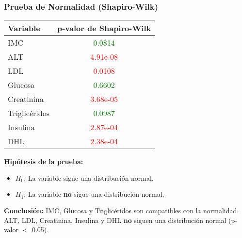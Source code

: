 \documentclass[
	11pt, %
]{beamer}
\begin{document}
\begin{frame}
    \frametitle{Prueba de Normalidad (Shapiro-Wilk)}

    \scriptsize
    \begin{table}[]
        \centering
        \begin{tabular}{l c}
            \hline
            \textbf{Variable} & \textbf{p-valor de Shapiro-Wilk} \\
            \hline
            IMC & \textcolor{green}{0.0814} \\
            ALT & \textcolor{red}{4.91e-08} \\
            LDL & \textcolor{red}{0.0108} \\
            Glucosa & \textcolor{green}{0.6602} \\
            Creatinina & \textcolor{red}{3.68e-05} \\
            Triglicéridos & \textcolor{green}{0.0987} \\
            Insulina & \textcolor{red}{2.87e-04} \\
            DHL & \textcolor{red}{2.38e-04} \\
            \hline
        \end{tabular}
    \end{table}

    \vspace{0.3cm}
    \textbf{Hipótesis de la prueba:}
    \begin{itemize}
        \item $H_0$: La variable sigue una distribución normal.
        \item $H_1$: La variable \textbf{no} sigue una distribución normal.
    \end{itemize}

    \vspace{0.2cm}
    \textbf{Conclusión:} IMC, Glucosa y Triglicéridos son compatibles con la normalidad.  
    ALT, LDL, Creatinina, Insulina y DHL \textbf{no} siguen una distribución normal (p-valor $<$ 0.05).
\end{frame}
\end{document}
